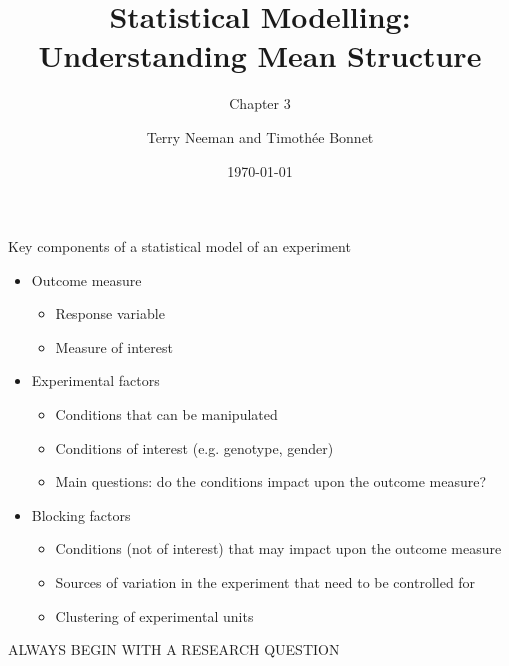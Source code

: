 \documentclass{beamer}
\title{Statistical Modelling: Understanding Mean Structure}
\subtitle{Chapter 3}
\author{Terry Neeman and Timoth\'ee Bonnet}
\date{\today}
\begin{document}



\begin{frame}{}
\maketitle

\end{frame}


\begin{frame}{Key components of a statistical model of an experiment}
\begin{itemize}
  \item Outcome measure
  \begin{itemize}
   \item Response variable
   \item Measure of interest
  \end{itemize}
  \item Experimental factors 
  \begin{itemize}
   \item Conditions that can be manipulated 
   \item Conditions of interest (e.g. genotype, gender) 
   \item Main questions: do the conditions impact upon the outcome measure?
  \end{itemize}
  \item Blocking factors
  \begin{itemize}
   \item Conditions (not of interest) that may impact upon the outcome measure
   \item Sources of variation in the experiment that need to be controlled for
   \item Clustering of experimental units
  \end{itemize}
\end{itemize}

\vspace{0.2cm}
ALWAYS BEGIN WITH A RESEARCH QUESTION

\end{frame}
\end{document}
